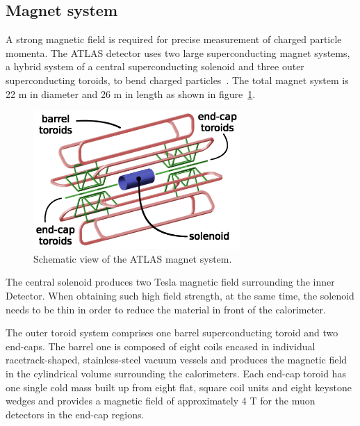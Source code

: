 \subsection{Magnet system}

A strong magnetic field is required for precise measurement of charged particle momenta.
The ATLAS detector uses two large superconducting magnet systems, a hybrid system of a central superconducting solenoid and three outer superconducting toroids, to bend charged particles~\cite{McFayden:phdthesis}.
The total magnet system is 22 m in diameter and 26 m in length as shown in figure~\ref{fig:megnet_sys}.
\begin{figure}[!htb]
  \centering
  \includegraphics[width=0.7\textwidth]{figures/Detector/magnetSystems.png}
  \caption{Schematic view of the ATLAS magnet system.}
  \label{fig:megnet_sys}
\end{figure}

The central solenoid produces two Tesla magnetic field surrounding the inner Detector.
When obtaining such high field strength, at the same time, the solenoid needs to be thin in order to reduce the material in front of the calorimeter.

The outer toroid system comprises one barrel superconducting toroid and two end-caps.
The barrel one is composed of eight coils encased in individual racetrack-shaped, stainless-steel vacuum vessels and produces the magnetic field in the cylindrical volume surrounding the calorimeters.
Each end-cap toroid has one single cold mass built up from eight flat, square coil units and eight keystone wedges and provides a magnetic field of approximately 4 T for the muon detectors in the end-cap regions.
